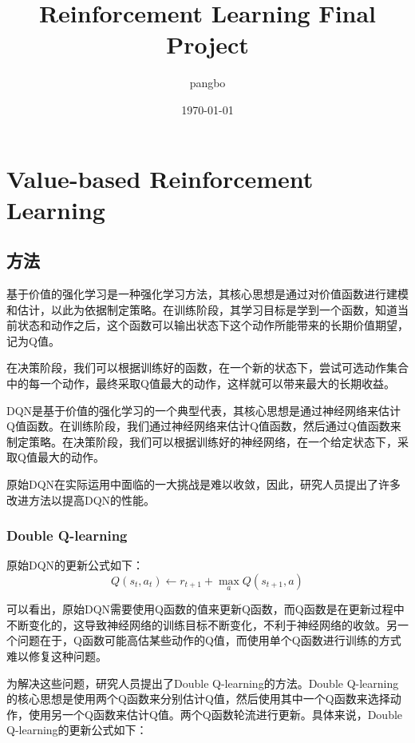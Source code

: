 \documentclass{article}
\title{Reinforcement Learning Final Project} %
\author{pangbo} %
\date{\today} %
\begin{document}
\maketitle %


\section{Value-based Reinforcement Learning}

\subsection{方法}

基于价值的强化学习是一种强化学习方法，其核心思想是通过对价值函数进行建模和估计，以此为依据制定策略。在训练阶段，其学习目标是学到一个函数，知道当前状态和动作之后，这个函数可以输出状态下这个动作所能带来的长期价值期望，记为Q值。

在决策阶段，我们可以根据训练好的函数，在一个新的状态下，尝试可选动作集合中的每一个动作，最终采取Q值最大的动作，这样就可以带来最大的长期收益。

DQN是基于价值的强化学习的一个典型代表，其核心思想是通过神经网络来估计Q值函数。在训练阶段，我们通过神经网络来估计Q值函数，然后通过Q值函数来制定策略。在决策阶段，我们可以根据训练好的神经网络，在一个给定状态下，采取Q值最大的动作。

原始DQN在实际运用中面临的一大挑战是难以收敛，因此，研究人员提出了许多改进方法以提高DQN的性能。

\subsubsection{Double Q-learning}

原始DQN的更新公式如下：
\begin{equation}
	Q(s_t, a_t) \leftarrow r_{t+1} + \max_{a} Q(s_{t+1}, a)
	\label{eq:q-learning}
\end{equation}

可以看出，原始DQN需要使用Q函数的值来更新Q函数，而Q函数是在更新过程中不断变化的，这导致神经网络的训练目标不断变化，不利于神经网络的收敛。另一个问题在于，Q函数可能高估某些动作的Q值，而使用单个Q函数进行训练的方式难以修复这种问题。

为解决这些问题，研究人员提出了Double Q-learning的方法。Double Q-learning的核心思想是使用两个Q函数来分别估计Q值，然后使用其中一个Q函数来选择动作，使用另一个Q函数来估计Q值。两个Q函数轮流进行更新。具体来说，Double Q-learning的更新公式如下：
\end{document}
